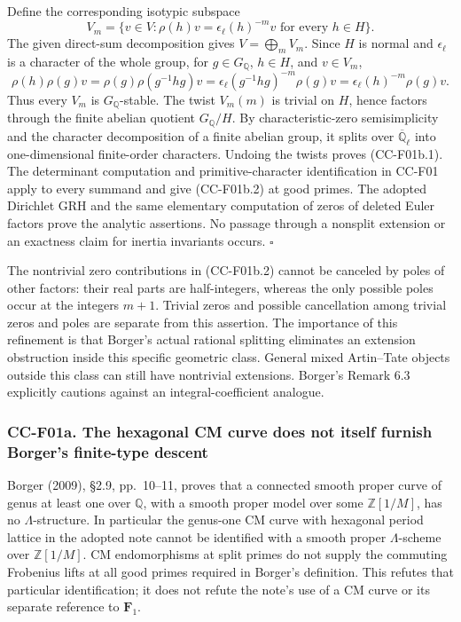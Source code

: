 Define the corresponding isotypic subspace \[
 V_m=\{v\in V:\rho(h)v=\epsilon_\ell(h)^{-m}v\text{ for every }h\in H\}.
\] The given direct-sum decomposition gives \(V=\bigoplus_m V_m\). Since
\(H\) is normal and \(\epsilon_\ell\) is a character of the whole group,
for \(g\in G_\mathbb Q\), \(h\in H\), and \(v\in V_m\), \[
 \rho(h)\rho(g)v
 =\rho(g)\rho(g^{-1}hg)v
 =\epsilon_\ell(g^{-1}hg)^{-m}\rho(g)v
 =\epsilon_\ell(h)^{-m}\rho(g)v.
\] Thus every \(V_m\) is \(G_\mathbb Q\)-stable. The twist \(V_m(m)\) is
trivial on \(H\), hence factors through the finite abelian quotient
\(G_\mathbb Q/H\). By characteristic-zero semisimplicity and the
character decomposition of a finite abelian group, it splits over
\(\overline{\mathbb Q}_\ell\) into one-dimensional finite-order
characters. Undoing the twists proves (CC-F01b.1). The determinant
computation and primitive-character identification in CC-F01 apply to
every summand and give (CC-F01b.2) at good primes. The adopted Dirichlet
GRH and the same elementary computation of zeros of deleted Euler
factors prove the analytic assertions. No passage through a nonsplit
extension or an exactness claim for inertia invariants occurs.
\(\square\)

The nontrivial zero contributions in (CC-F01b.2) cannot be canceled by
poles of other factors: their real parts are half-integers, whereas the
only possible poles occur at the integers \(m+1\). Trivial zeros and
possible cancellation among trivial zeros and poles are separate from
this assertion. The importance of this refinement is that Borger's
actual rational splitting eliminates an extension obstruction inside
this specific geometric class. General mixed Artin--Tate objects outside
this class can still have nontrivial extensions. Borger's Remark 6.3
explicitly cautions against an integral-coefficient analogue.

\subsubsection{CC-F01a. The hexagonal CM curve does not itself furnish
Borger's finite-type
descent}\label{cc-f01a.-the-hexagonal-cm-curve-does-not-itself-furnish-borgers-finite-type-descent}

Borger (2009), §2.9, pp.~10--11, proves that a connected smooth proper
curve of genus at least one over \(\mathbb Q\), with a smooth proper
model over some \(\mathbb Z[1/M]\), has no \(\Lambda\)-structure. In
particular the genus-one CM curve with hexagonal period lattice in the
adopted note cannot be identified with a smooth proper
\(\Lambda\)-scheme over \(\mathbb Z[1/M]\). CM endomorphisms at split
primes do not supply the commuting Frobenius lifts at all good primes
required in Borger's definition. This refutes that particular
identification; it does not refute the note's use of a CM curve or its
separate reference to \(\mathbf F_1\).

